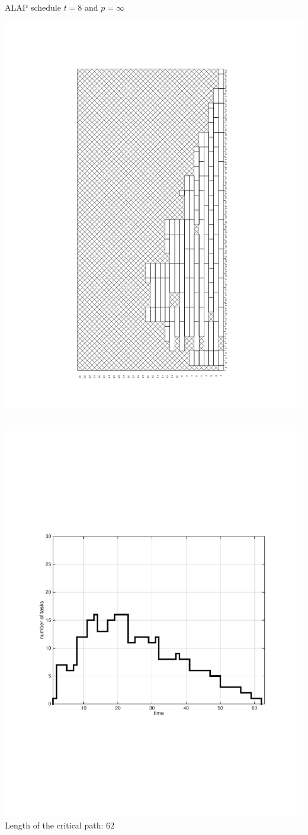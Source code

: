 \begin{frame}
ALAP schedule $t=8$ and $p=\infty$\\

  {\begin{minipage}{.25\textwidth}\vspace*{-2.8cm}
  \includegraphics[width=\textwidth,angle=270]{./fig/t8_p30_bwd.pdf}\end{minipage}}
  ~~~~~~~~~~~~~~~~~~~~~~~~~~~~~~~~~\includegraphics[width=.45\textwidth]{matlab_files/qqq_t8_v2.pdf}\\

Length of the critical path: $62$

\end{frame}




